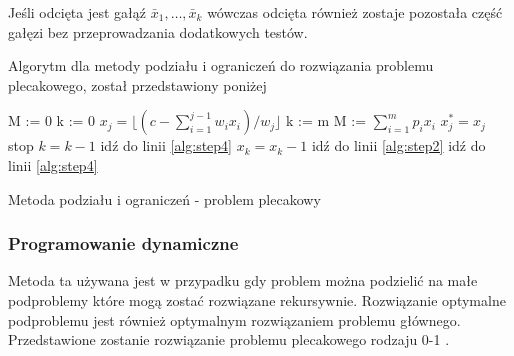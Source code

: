 Jeśli odcięta jest gałąź $\bar{x}_1, \dots, \bar{x}_k$ wówczas odcięta również zostaje pozostała część gałęzi bez przeprowadzania dodatkowych testów.

Algorytm dla metody podziału i ograniczeń do rozwiązania problemu plecakowego, został przedstawiony poniżej

\begin{algorithm}
  \begin{algorithmic}[1]
    \State M := 0
    \State k := 0
     \label{alg:step2}
      \State $ x_j = \lfloor{(c - \sum_{i=1}^{j-1}w_ix_i)/w_j}\rfloor$
    \EndFor
    \State k := m
      \State M := $\sum_{i=1}^m p_ix_i$
        \State $x_j^* = x_j$
      \EndFor
    \EndIf
     \label{alg:step4}
      \State stop
    \Else
      \State $k=k-1$
    \EndIf
      \State idź do linii \ref{alg:step4}
    \Else
      \State $x_k = x_k - 1$
    \EndIf
      \State idź do linii \ref{alg:step2}
    \Else
      \State idź do linii \ref{alg:step4}
    \EndIf
  \end{algorithmic}
    \caption{Metoda podziału i ograniczeń - problem plecakowy}
\end{algorithm}

\subsubsection{Programowanie dynamiczne}\label{knapsack:dynamicProgramming}
Metoda ta używana jest w przypadku gdy problem można podzielić na małe podproblemy które mogą zostać rozwiązane rekursywnie. Rozwiązanie optymalne podproblemu jest również optymalnym rozwiązaniem problemu głównego. Przedstawione zostanie rozwiązanie problemu plecakowego rodzaju 0-1 \cite{GoddardLecture}.

